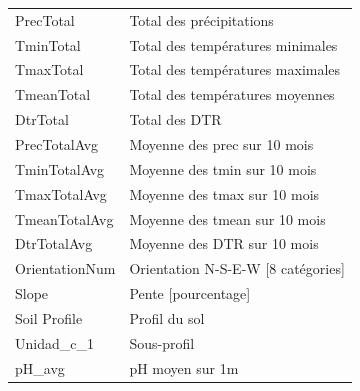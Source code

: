 \begin{table}[H]
\begin{tabular}{ll}
		PrecTotal       & Total des précipitations                           \\
		TminTotal       & Total des températures minimales                   \\
		TmaxTotal       & Total des températures maximales                   \\
		TmeanTotal      & Total des températures moyennes                    \\
		DtrTotal        & Total des DTR                                      \\
		PrecTotalAvg    & Moyenne des prec sur 10 mois                       \\
		TminTotalAvg    & Moyenne des tmin sur 10 mois                       \\
		TmaxTotalAvg    & Moyenne des tmax sur 10 mois                       \\
		TmeanTotalAvg   & Moyenne des tmean sur 10 mois                      \\
		DtrTotalAvg     & Moyenne des DTR sur 10 mois                        \\
		OrientationNum  & Orientation N-S-E-W {[}8 catégories{]}             \\
		Slope           & Pente {[}pourcentage{]}                            \\
		Soil Profile    & Profil du sol                                      \\
		Unidad\_c\_1    & Sous-profil                                        \\
		pH\_avg         & pH moyen sur 1m                                    \\
	\end{tabular}
\end{table}
